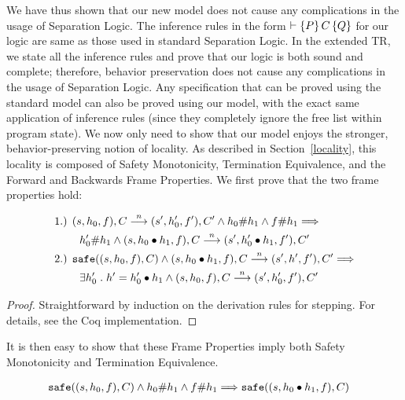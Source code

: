 We have thus shown that our new model does not cause any complications in the usage of Separation Logic.
\else
\noindent{}The inference rules in the form $\vdash \{P\}\,C\,\{Q\}$ for our logic
are same as those used in standard Separation Logic.
In the extended TR, we state all the inference rules and prove that our logic is both sound and 
complete; therefore, behavior preservation does not cause any complications in the usage of Separation 
Logic. 
\fi
Any specification that can be proved using the standard model can also be proved using our model,
with the exact same application of inference rules (since they completely ignore the
free list within program state). 
\ifextended
We now
only need to show that our model enjoys the stronger, behavior-preserving notion of locality. As
described in Section~\ref{locality}, this locality is composed of Safety Monotonicity, Termination
Equivalence, and the Forward and Backwards Frame Properties. We first prove that the two frame 
properties hold:

\begin{thm}
\begin{align*}
& \text{1.) } (s,h_0,f),C \stackrel{n}{\longrightarrow} (s',h_0',f'),C' \land h_0 \# h_1 \land f \# h_1 \Longrightarrow \\
& \hspace{8mm} h_0' \# h_1 \land (s,h_0 \bullet h_1,f),C \stackrel{n}{\longrightarrow} (s',h_0' \bullet h_1,f'),C' \\
& \text{2.) } \text{\tt{safe}}((s,h_0,f),C) \land (s,h_0 \bullet h_1,f),C \stackrel{n}{\longrightarrow} (s',h',f'),C' \Longrightarrow \\
& \hspace{8mm} \exists h_0' \hspace{1mm} . \hspace{1mm} h' = h_0' \bullet h_1 \land (s,h_0,f),C \stackrel{n}{\longrightarrow} (s',h_0',f'),C'
\end{align*}
\end{thm}

\begin{proof}
Straightforward by induction on the derivation rules for stepping. For details, see the Coq implementation.
\end{proof}

It is then easy to show that these Frame Properties imply both Safety Monotonicity and Termination Equivalence.

\begin{lem}
\begin{align*}
\text{\tt{safe}} & ((s,h_0,f),C) \land h_0 \# h_1 \land f \# h_1 \Longrightarrow \text{\tt{safe}}((s,h_0 \bullet h_1,f),C)
\end{align*}
\end{lem}

